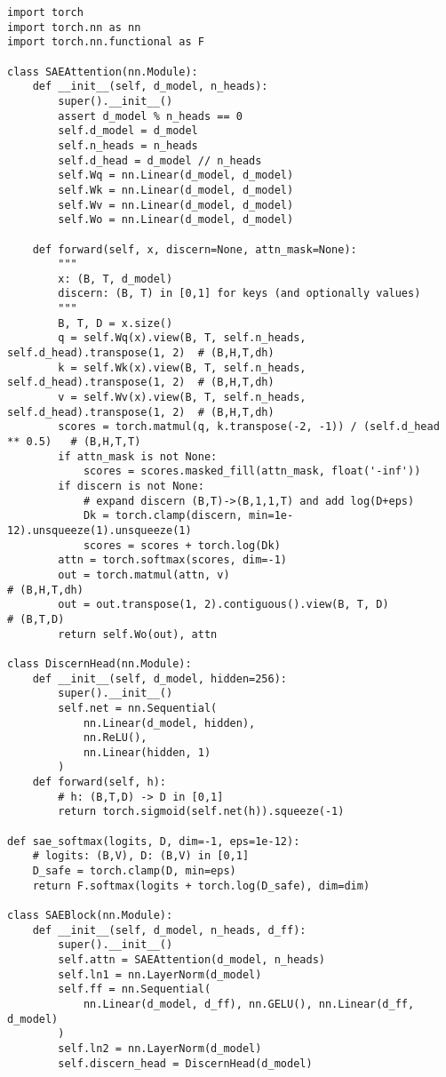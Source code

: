 \documentclass[11pt]{article}
\theoremstyle{plain}
\theoremstyle{definition}
\theoremstyle{remark}
\begin{document}
\begin{verbatim}
import torch
import torch.nn as nn
import torch.nn.functional as F

class SAEAttention(nn.Module):
    def __init__(self, d_model, n_heads):
        super().__init__()
        assert d_model % n_heads == 0
        self.d_model = d_model
        self.n_heads = n_heads
        self.d_head = d_model // n_heads
        self.Wq = nn.Linear(d_model, d_model)
        self.Wk = nn.Linear(d_model, d_model)
        self.Wv = nn.Linear(d_model, d_model)
        self.Wo = nn.Linear(d_model, d_model)

    def forward(self, x, discern=None, attn_mask=None):
        """
        x: (B, T, d_model)
        discern: (B, T) in [0,1] for keys (and optionally values)
        """
        B, T, D = x.size()
        q = self.Wq(x).view(B, T, self.n_heads, self.d_head).transpose(1, 2)  # (B,H,T,dh)
        k = self.Wk(x).view(B, T, self.n_heads, self.d_head).transpose(1, 2)  # (B,H,T,dh)
        v = self.Wv(x).view(B, T, self.n_heads, self.d_head).transpose(1, 2)  # (B,H,T,dh)
        scores = torch.matmul(q, k.transpose(-2, -1)) / (self.d_head ** 0.5)   # (B,H,T,T)
        if attn_mask is not None:
            scores = scores.masked_fill(attn_mask, float('-inf'))
        if discern is not None:
            # expand discern (B,T)->(B,1,1,T) and add log(D+eps)
            Dk = torch.clamp(discern, min=1e-12).unsqueeze(1).unsqueeze(1)
            scores = scores + torch.log(Dk)
        attn = torch.softmax(scores, dim=-1)
        out = torch.matmul(attn, v)                                           # (B,H,T,dh)
        out = out.transpose(1, 2).contiguous().view(B, T, D)                  # (B,T,D)
        return self.Wo(out), attn

class DiscernHead(nn.Module):
    def __init__(self, d_model, hidden=256):
        super().__init__()
        self.net = nn.Sequential(
            nn.Linear(d_model, hidden),
            nn.ReLU(),
            nn.Linear(hidden, 1)
        )
    def forward(self, h):
        # h: (B,T,D) -> D in [0,1]
        return torch.sigmoid(self.net(h)).squeeze(-1)

def sae_softmax(logits, D, dim=-1, eps=1e-12):
    # logits: (B,V), D: (B,V) in [0,1]
    D_safe = torch.clamp(D, min=eps)
    return F.softmax(logits + torch.log(D_safe), dim=dim)

class SAEBlock(nn.Module):
    def __init__(self, d_model, n_heads, d_ff):
        super().__init__()
        self.attn = SAEAttention(d_model, n_heads)
        self.ln1 = nn.LayerNorm(d_model)
        self.ff = nn.Sequential(
            nn.Linear(d_model, d_ff), nn.GELU(), nn.Linear(d_ff, d_model)
        )
        self.ln2 = nn.LayerNorm(d_model)
        self.discern_head = DiscernHead(d_model)


\end{verbatim}
\end{document}

